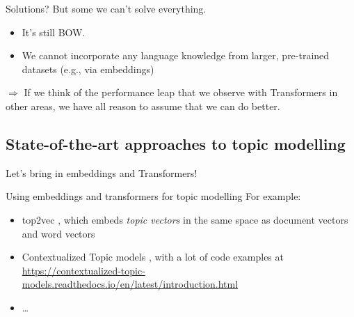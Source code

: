 	
	\begin{frame}{Solutions?}
	  But some we can't solve everything.
	
	  \begin{itemize}
	  \item It's still BOW.
	  \item We cannot incorporate any language knowledge from larger, pre-trained datasets (e.g., via embeddings)
	  \end{itemize}
	
	$\Rightarrow$ If we think of the performance leap that we observe with Transformers in other areas, we have all reason to assume that we can do better.
	\end{frame}
	
	
	\subsection{State-of-the-art approaches to topic modelling}
	
	\begin{frame}[standout]
	Let's bring in embeddings and Transformers!
	\end{frame}
	
	
	\begin{frame}{Using embeddings and transformers for topic modelling}
	  For example:
	  \begin{itemize}[<+->]
	  \item top2vec \parencite{angelov2020top2vec}, which embeds \emph{topic vectors} in the same space as document vectors and word vectors
	  \item Contextualized Topic models \parencite{bianchi-etal-2021-pre,bianchi-etal-2021-cross}, with a lot of code examples at \url{https://contextualized-topic-models.readthedocs.io/en/latest/introduction.html}
	  \item \ldots
		\end{itemize}
	 
	\end{frame}
	
	
	

